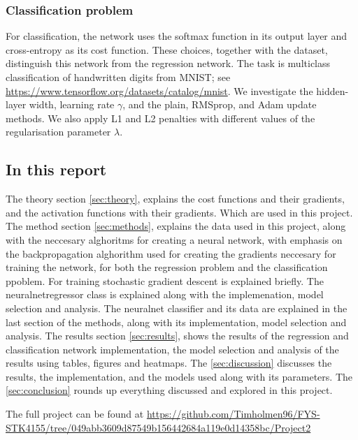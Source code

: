 \subsubsection{Classification problem}
For classification, the network uses the softmax function in its output layer
and cross-entropy as its cost function. These choices, together with the
dataset, distinguish this network from the regression network. The task is
multiclass classification of handwritten digits from MNIST; see
\url{https://www.tensorflow.org/datasets/catalog/mnist}. We investigate the
hidden-layer width, learning rate $\gamma$, and the plain, RMSprop, and Adam
update methods. We also apply L1 and L2 penalties with different values of
the regularisation parameter $\lambda$.

\subsection{In this report}
The theory section \ref{sec:theory}, explains the 
cost functions and their gradients, and the activation functions
with their gradients. Which are used in this project.
The method section \ref{sec:methods}, explains the data used in this
project, along with the neccesary alghoritms for creating
a neural network, with emphasis on the backpropagation alghorithm
used for creating the gradients neccesary for training the network,
for both the regression problem and the classification ppoblem.
For training stochastic gradient descent is explained briefly.
The neuralnetregressor class is explained along with the
implemenation, model selection and analysis. The neuralnet classifier
and its data are explained in the last section of the methods,
along with its implementation, model selection and analysis. 
The results section \ref{sec:results}, shows the 
results of the regression and classification network
implementation, the model selection and analysis of the results 
using tables, figures and heatmaps. The \ref{sec:discussion}
discusses the results, the implementation, and the models used 
along with its parameters. The \ref{sec:conclusion} rounds up everything discussed
and explored in this project.  

The full project can be found at \url{https://github.com/Timholmen96/FYS-STK4155/tree/049abb3609d87549b156442684a119e0d14358bc/Project2} 
